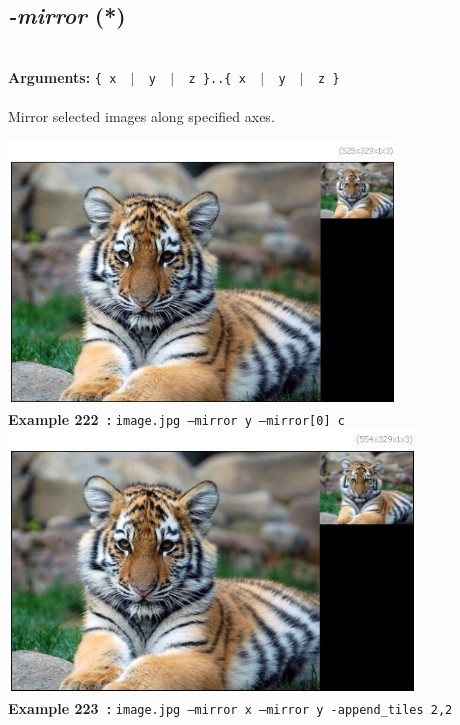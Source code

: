 \documentclass[a4paper,11pt,twoside]{book}
\begin{document}
\subsection{\emph{-mirror} (*)}\vspace*{-0.5em}
~\\\textbf{Arguments: } 
{\small \texttt{\{ x ~$|$~ y ~$|$~ z \}..\{ x ~$|$~ y ~$|$~ z \}}}\\~\\
Mirror selected images along specified axes.
\begin{center}\includegraphics[keepaspectratio=true,height=7cm,width=\textwidth]{img/gmic_def222.jpg}\\
{\footnotesize \textbf{Example 222~:} \texttt{image.jpg --mirror y --mirror[0] c}}
\\\includegraphics[keepaspectratio=true,height=7cm,width=\textwidth]{img/gmic_def223.jpg}\\
{\footnotesize \textbf{Example 223~:} \texttt{image.jpg --mirror x --mirror y -append\_tiles 2,2}}
\end{center}
\end{document}
